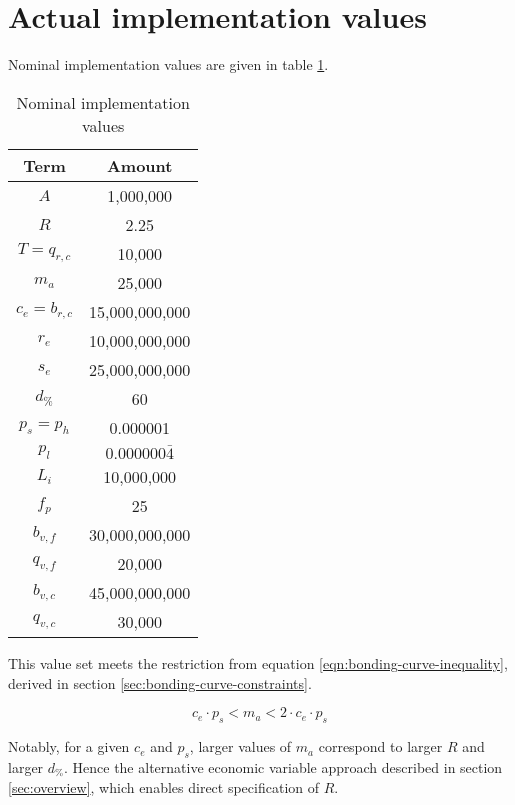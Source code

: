 \documentclass[table, twocolumn]{article}
\begin{document}
\section{Actual implementation values}

Nominal implementation values are given in table
\ref{tab:nominal-implementation-values}.

\begin{table}[!htb]
  \centering
  \begin{tabular}{|c|c|}
    \hline \rowcolor{blue}
    Term            & Amount        \\ \hline
    $A$ & 1,000,000 \\ \hline
    $R$ & 2.25 \\ \hline
    $T = q_{r ,c}$ & 10,000 \\ \hline
    $m_a$ & 25,000 \\ \hline
    $c_e = b_{r, c}$ & 15,000,000,000 \\ \hline
    $r_e$ & 10,000,000,000 \\ \hline
    $s_e$ & 25,000,000,000 \\ \hline
    $d_\%$ & 60 \\ \hline
    $p_s = p_h$ & 0.000001 \\ \hline
    \rule{0pt}{10pt} %
    $p_l$ & $0.000000\bar{4}$ \\ \hline
    $L_i$ & 10,000,000 \\ \hline
    $f_p$ & 25 \\ \hline
    $b_{v, f}$ & 30,000,000,000 \\ \hline
    $q_{v, f}$ & 20,000 \\ \hline
    $b_{v, c}$ & 45,000,000,000 \\ \hline
    $q_{v, c}$ & 30,000 \\ \hline
  \end{tabular}
  \caption{Nominal implementation values}
  \label{tab:nominal-implementation-values}
\end{table}

This value set meets the restriction from equation \ref{eqn:bonding-curve-inequality},
derived in section \ref{sec:bonding-curve-constraints}.

\begin{equation} \label{eqn:bonding-curve-inequality}
  c_e \cdot p_s < m_a < 2 \cdot c_e \cdot p_s
\end{equation}

Notably, for a given $c_e$ and $p_s$, larger values of $m_a$ correspond to larger $R$
and larger $d_\%$. Hence the alternative economic variable approach described in section
\ref{sec:overview}, which enables direct specification of $R$.
\end{document}
